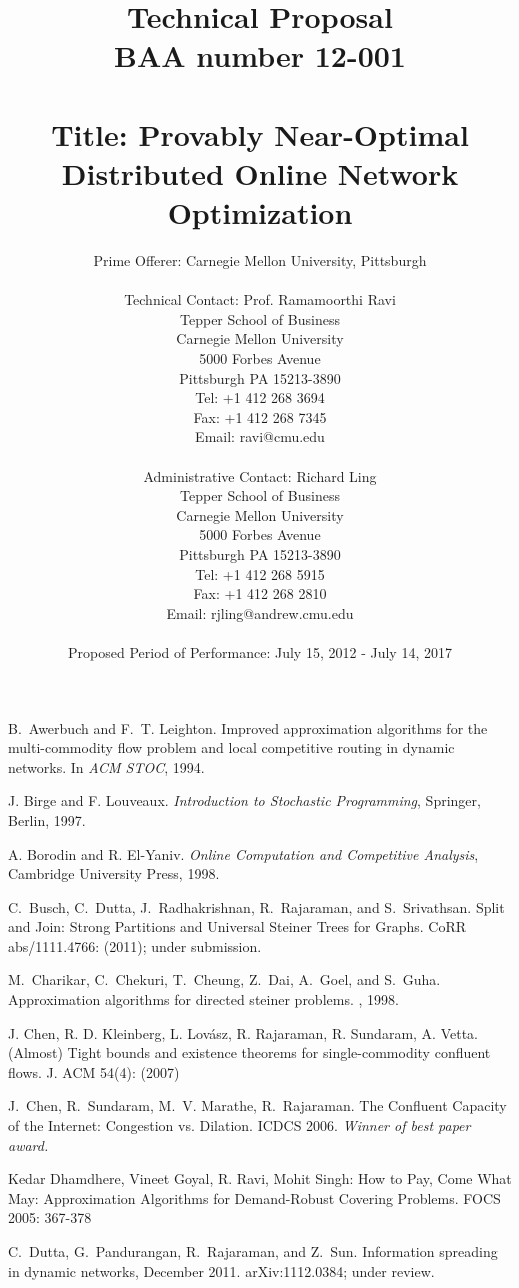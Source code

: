 \documentclass{article}
\title{Technical Proposal\\
BAA number 12-001\\
\ \\
Title: Provably Near-Optimal Distributed Online Network Optimization\\}
\author{Prime Offerer: Carnegie Mellon University, Pittsburgh\\
 \ \\
 Technical Contact: Prof. Ramamoorthi Ravi\\
 Tepper School of Business\\
 Carnegie Mellon University\\
 5000 Forbes Avenue\\
 Pittsburgh PA 15213-3890\\
 Tel: +1 412 268 3694\\
 Fax: +1 412 268 7345\\
 Email: ravi@cmu.edu\\
 \ \\
 Administrative Contact: Richard Ling\\
 Tepper School of Business\\
 Carnegie Mellon University\\
 5000 Forbes Avenue\\
 Pittsburgh PA 15213-3890\\
 Tel: +1 412 268 5915\\
 Fax: +1 412 268 2810\\
 Email: rjling@andrew.cmu.edu\\
 \ \\
 Proposed Period of Performance: July 15, 2012 - July 14, 2017\\
 }
\date{}
\begin{document}



\maketitle
\titlepage





{\small

\begin{thebibliography}{99}

B.~Awerbuch and F.~T. Leighton.
\newblock Improved approximation algorithms for the multi-commodity flow
  problem and local competitive routing in dynamic networks.
\newblock In {\em ACM STOC}, 1994.

J. Birge and F. Louveaux. {\em Introduction to Stochastic
Programming}, Springer, Berlin, 1997.

A. Borodin and R. El-Yaniv. {\em Online Computation and Competitive Analysis}, Cambridge University Press, 1998.

 C.~Busch, C.~Dutta, J.~Radhakrishnan,
  R.~Rajaraman, and S.~Srivathsan.
\newblock Split and Join: Strong Partitions
  and Universal Steiner Trees for Graphs.
\newblock CoRR abs/1111.4766: (2011); under submission.

M.~Charikar, C.~Chekuri, T.~Cheung, Z.~Dai, A.~Goel, and S.~Guha.
\newblock Approximation algorithms for directed steiner problems.
, 1998.

J. Chen, R. D. Kleinberg, L. Lov\'{a}sz, R. Rajaraman, R. Sundaram, A. Vetta.
\newblock (Almost) Tight bounds and existence theorems for single-commodity confluent flows.
\newblock J. ACM 54(4): (2007)

J.~Chen, R.~Sundaram, M.~V. Marathe, R.~Rajaraman.
\newblock The Confluent Capacity of the Internet: Congestion vs. Dilation.
\newblock ICDCS 2006.  {\em Winner of best paper award.}

 Kedar Dhamdhere, Vineet Goyal, R. Ravi, Mohit Singh: How to Pay, Come What May: Approximation Algorithms for Demand-Robust Covering Problems. FOCS 2005: 367-378

C.~Dutta, G.~Pandurangan, R.~Rajaraman, and Z.~Sun.
\newblock Information spreading in dynamic networks, December 2011.
\newblock arXiv:1112.0384; under review.


\end{thebibliography}}
\end{document}
